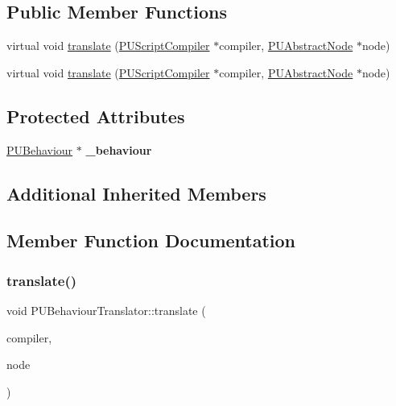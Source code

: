 \subsection*{Public Member Functions}
\begin{DoxyCompactItemize}
\item 
virtual void \hyperlink{classPUBehaviourTranslator_a72a3e8c1d3cbf0b123654f07ebea1153}{translate} (\hyperlink{classPUScriptCompiler}{P\+U\+Script\+Compiler} $\ast$compiler, \hyperlink{classPUAbstractNode}{P\+U\+Abstract\+Node} $\ast$node)
\item 
virtual void \hyperlink{classPUBehaviourTranslator_a0a5871f37f1301e810ebe57b94e10514}{translate} (\hyperlink{classPUScriptCompiler}{P\+U\+Script\+Compiler} $\ast$compiler, \hyperlink{classPUAbstractNode}{P\+U\+Abstract\+Node} $\ast$node)
\end{DoxyCompactItemize}
\subsection*{Protected Attributes}
\begin{DoxyCompactItemize}
\item 
\mbox{\label{classPUBehaviourTranslator_a0cde0a12f16315b1e756a3067c0d78bc}} 
\hyperlink{classPUBehaviour}{P\+U\+Behaviour} $\ast$ {\bfseries \+\_\+behaviour}
\end{DoxyCompactItemize}
\subsection*{Additional Inherited Members}


\subsection{Member Function Documentation}
\mbox{\label{classPUBehaviourTranslator_a72a3e8c1d3cbf0b123654f07ebea1153}} 
\subsubsection{\texorpdfstring{translate()}{translate()}\hspace{0.1cm}{\footnotesize\ttfamily [1/2]}}
{\footnotesize\ttfamily void P\+U\+Behaviour\+Translator\+::translate (\begin{DoxyParamCaption}\item[{\hyperlink{classPUScriptCompiler}{P\+U\+Script\+Compiler} $\ast$}]{compiler,  }\item[{\hyperlink{classPUAbstractNode}{P\+U\+Abstract\+Node} $\ast$}]{node }\end{DoxyParamCaption})\hspace{0.3cm}{\ttfamily [virtual]}}


